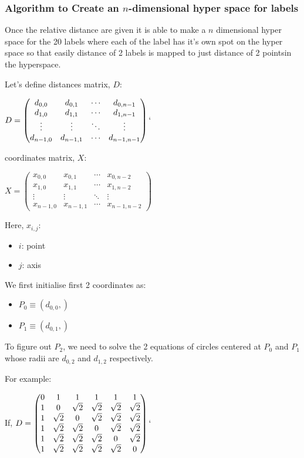 \subsubsection{Algorithm to Create an $n$-dimensional hyper space for labels}
Once the relative distance are given it is able to make a $n$ dimensional hyper space for the 20 labels where each of the label has it's own spot on the hyper space so that easily distance of 2 labels is mapped to just distance of 2 pointsin the hyperspace.

Let's define distances matrix, $D$:

$
D =
 \begin{pmatrix}
  d_{0,0} & d_{0,1} & \cdots & d_{0,n-1} \\
  d_{1,0} & d_{1,1} & \cdots & d_{1,n-1} \\
  \vdots  & \vdots  & \ddots & \vdots  \\
  d_{n-1,0} & d_{n-1,1} & \cdots & d_{n-1,n-1}
 \end{pmatrix}
`$

coordinates matrix, $X$:

$
X =
 \begin{pmatrix}
  x_{0,0} & x_{0,1} & \cdots & x_{0,n-2} \\
  x_{1,0} & x_{1,1} & \cdots & x_{1,n-2} \\
  \vdots  & \vdots  & \ddots & \vdots  \\
  x_{n-1,0} & x_{n-1,1} & \cdots & x_{n-1,n-2}
 \end{pmatrix}
$

Here, $x_{i,j}$: 
\begin{itemize}
\item $i$: point
\item $j$: axis
\end{itemize}


We first initialise first 2 coordinates as:
\begin{itemize}
\item $P_0\equiv(d_{0,0},)$
\item $P_1\equiv(d_{0,1},)$
\end{itemize}


To figure out $P_2$, we need to solve the 2 equations of circles centered at $P_0$ and $P_1$ whose radii are $d_{0,2}$ and $d_{1,2}$ respectively.

For example:

If,
$
D =
 \begin{pmatrix}
 0 & 1 & 1 & 1 & 1 & 1 \\
 1 & 0 & \sqrt{2} & \sqrt{2} & \sqrt{2} & \sqrt{2} \\
 1 & \sqrt{2} & 0 & \sqrt{2} & \sqrt{2} & \sqrt{2} \\
 1 & \sqrt{2} & \sqrt{2} & 0 & \sqrt{2} & \sqrt{2} \\
 1 & \sqrt{2} & \sqrt{2} & \sqrt{2} & 0 & \sqrt{2} \\
 1 & \sqrt{2} & \sqrt{2} & \sqrt{2} & \sqrt{2} & 0 \\
 \end{pmatrix}
`$


